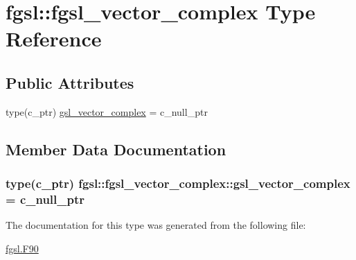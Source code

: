 \hypertarget{structfgsl_1_1fgsl__vector__complex}{}\section{fgsl\+:\+:fgsl\+\_\+vector\+\_\+complex Type Reference}
\label{structfgsl_1_1fgsl__vector__complex}
\subsection*{Public Attributes}
\begin{DoxyCompactItemize}
\item 
type(c\+\_\+ptr) \hyperlink{structfgsl_1_1fgsl__vector__complex_a9fed96657e9f003cee00b0a7ad3c4412}{gsl\+\_\+vector\+\_\+complex} = c\+\_\+null\+\_\+ptr
\end{DoxyCompactItemize}


\subsection{Member Data Documentation}
\hypertarget{structfgsl_1_1fgsl__vector__complex_a9fed96657e9f003cee00b0a7ad3c4412}{}
\subsubsection[{gsl\+\_\+vector\+\_\+complex}]{\setlength{\rightskip}{0pt plus 5cm}type(c\+\_\+ptr) fgsl\+::fgsl\+\_\+vector\+\_\+complex\+::gsl\+\_\+vector\+\_\+complex = c\+\_\+null\+\_\+ptr}\label{structfgsl_1_1fgsl__vector__complex_a9fed96657e9f003cee00b0a7ad3c4412}


The documentation for this type was generated from the following file\+:\begin{DoxyCompactItemize}
\item 
\hyperlink{fgsl_8F90}{fgsl.\+F90}\end{DoxyCompactItemize}

